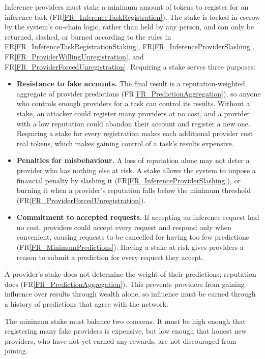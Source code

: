 \documentclass[12pt]{article}
\newcommand{\rref}[1]{FR\ref{#1}}
\begin{document}
Inference providers must stake a minimum amount of tokens to register for an
inference task (\rref{FR_InferenceTaskRegistration}). The stake is locked in
escrow by the system's on-chain logic, rather than held by any person, and can
only be returned, slashed, or burned according to the rules in
\rref{FR_InferenceTaskRegistrationStaking},
\rref{FR_InferenceProviderSlashing},
\rref{FR_ProviderWillingUnregistration}, and
\rref{FR_ProviderForcedUnregistration}. Requiring a stake serves three
purposes:

\begin{itemize}
    \item \textbf{Resistance to fake accounts.} The final result is a
    reputation-weighted aggregate of provider predictions
    (\rref{FR_PredictionAggregation}), so anyone who controls enough providers
    for a task can control its results. Without a stake, an attacker could
    register many providers at no cost, and a provider with a low reputation
    could abandon their account and register a new one. Requiring a stake for
    every registration makes each additional provider cost real tokens, which
    makes gaining control of a task's results expensive.

    \item \textbf{Penalties for misbehaviour.} A loss of reputation alone may
    not deter a provider who has nothing else at risk. A stake allows the
    system to impose a financial penalty by slashing it
    (\rref{FR_InferenceProviderSlashing}), or burning it when a provider's
    reputation falls below the minimum threshold
    (\rref{FR_ProviderForcedUnregistration}).

    \item \textbf{Commitment to accepted requests.} If accepting an inference
    request had no cost, providers could accept every request and respond only
    when convenient, causing requests to be cancelled for having too few
    predictions (\rref{FR_MinimumPredictions}). Having a stake at risk gives
    providers a reason to submit a prediction for every request they accept.
\end{itemize}

A provider's stake does not determine the weight of their predictions;
reputation does (\rref{FR_PredictionAggregation}). This prevents providers from
gaining influence over results through wealth alone, so influence must be
earned through a history of predictions that agree with the network.

The minimum stake must balance two concerns. It must be high enough that
registering many fake providers is expensive, but low enough that honest new
providers, who have not yet earned any rewards, are not discouraged from
joining.
\end{document}
